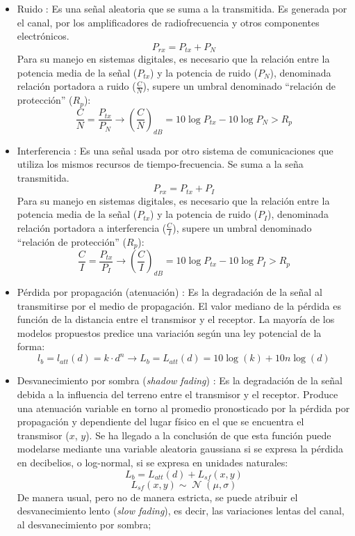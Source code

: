 \documentclass[12pt]{report} %
\begin{document}
\begin{itemize}
	\item Ruido \cite{RefWorks:78}: Es una señal aleatoria que se suma a la transmitida.
	Es generada por el canal, por los amplificadores de radiofrecuencia y otros componentes electrónicos.
	$$P_{rx} = P_{tx} + P_{N}$$
	Para su manejo en sistemas digitales, es necesario que la relación entre la potencia media de la señal ($P_{tx}$) y la potencia de ruido ($P_{N}$), denominada relación portadora a ruido ($\frac{C}{N}$), supere un umbral denominado ``relación de protección'' ($R_p$):
	$$\frac{C}{N} = \frac{P_{tx}}{P_{N}} \rightarrow \left( \frac{C}{N} \right)_{dB} = 10 \log P_{tx} - 10 \log P_{N} > R_p$$
	\item Interferencia \cite{RefWorks:78}: Es una señal usada por otro sistema de comunicaciones que utiliza los mismos recursos de tiempo-frecuencia.
	Se suma a la seña transmitida.
	$$P_{rx} = P_{tx} + P_{I}$$
	Para su manejo en sistemas digitales, es necesario que la relación entre la potencia media de la señal ($P_{tx}$) y la potencia de ruido ($P_{I}$), denominada relación portadora a interferencia ($\frac{C}{I}$), supere un umbral denominado ``relación de protección'' ($R_p$):
	$$\frac{C}{I} = \frac{P_{tx}}{P_{I}} \rightarrow \left( \frac{C}{I} \right)_{dB} = 10 \log P_{tx} - 10 \log P_{I} > R_p$$
	\item Pérdida por propagación (atenuación) \cite{RefWorks:79}: Es la degradación de la señal al transmitirse por el medio de propagación.
	El valor mediano de la pérdida es función de la distancia entre el transmisor y el receptor.
	La mayoría de los modelos propuestos predice una variación según una ley potencial de la forma:
	$$l_b = l_{att} (d) = k \cdot d^n \rightarrow L_b = L_{att} (d) = 10 \log (k) +10 n \log (d)$$
	\item Desvanecimiento por sombra (\textit{shadow fading}) \cite{RefWorks:79}: Es la degradación de la señal debida a la influencia del terreno entre el transmisor y el receptor.
	Produce una atenuación variable en torno al promedio pronosticado por la pérdida por propagación y dependiente del lugar físico en el que se encuentra el transmisor ($x$, $y$).
	Se ha llegado a la conclusión de que esta función puede modelarse mediante una variable aleatoria gaussiana si se expresa la pérdida en decibelios, o log-normal, si se expresa en unidades naturales:
	$$L_b = L_{att} (d) + L_{sf} (x, y)$$
	$$L_{sf} (x, y) \sim \operatorname{\mathcal{N}} (\mu, \sigma)$$
	De manera usual, pero no de manera estricta, se puede atribuir el desvanecimiento lento (\textit{slow fading}), es decir, las variaciones lentas del canal, al desvanecimiento por sombra;

\end{itemize}
\end{document}
